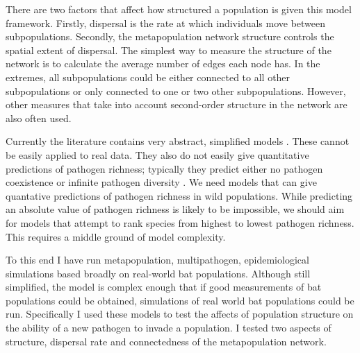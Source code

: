 There are two factors that affect how structured a population is given this model framework.
Firstly, dispersal is the rate at which individuals move between subpopulations.
Secondly, the metapopulation network structure controls the spatial extent of dispersal.
The simplest way to measure the structure of the network is to calculate the average number of edges each node has.
In the extremes, all subpopulations could be either connected to all other subpopulations or only connected to one or two other subpopulations.
However, other measures that take into account second-order structure in the network are also often used.






Currently the literature contains very abstract, simplified models \cite{qiu2013vector, allen2004sis, nunes2006localized, garmer2016multistrain}.
These cannot be easily applied to real data.
They also do not easily give quantitative predictions of pathogen richness; typically they predict either no pathogen coexistence \cite{bremermann1989competitive, martcheva2013competitive} or infinite pathogen diversity \cite{may1994superinfection}.
We need models that can give quantative predictions of pathogen richness in wild populations.
While predicting an absolute value of pathogen richness is likely to be impossible, we should aim for models that attempt to rank species from highest to lowest pathogen richness.
This requires a middle ground of model complexity.


To this end I have run metapopulation, multipathogen, epidemiological simulations based broadly on real-world bat populations.
Although still simplified, the model is complex enough that if good measurements of bat populations could be obtained, simulations of real world bat populations could be run.
Specifically I used these models to test the affects of population structure on the ability of a new pathogen to invade a population.
I tested two aspects of structure, dispersal rate and connectedness of the metapopulation network.


